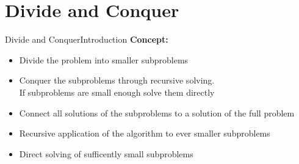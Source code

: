 \section{Divide and Conquer}
\label{chap:divide_and_conquer}


\begin{frame}{Divide and Conquer}{Introduction}
  \textbf{Concept:}
  \begin{itemize}
    \item<2->
      {\color{MainA}Divide} the problem into smaller subproblems
    \item<3->
      {\color{MainA}Conquer} the subproblems through recursive solving.\\
      If subproblems are small enough solve them directly
    \item<4->
      {\color{MainA}Connect} all solutions of the subproblems to a solution of the
      full problem
    \item<5->
      {\color{MainA}Recursive} application of the algorithm to ever smaller
      subproblems
    \item<6->
      {\color{MainA}Direct} solving of sufficently small subproblems
  \end{itemize}
\end{frame}





